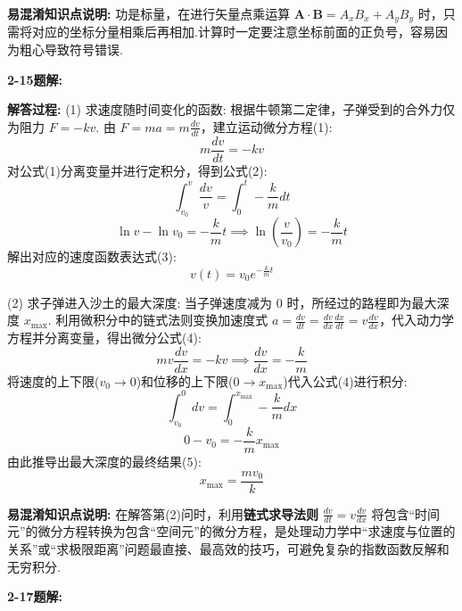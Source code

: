 \textbf{易混淆知识点说明:}
功是标量，在进行矢量点乘运算 $\mathbf{A} \cdot \mathbf{B} = A_x B_x + A_y B_y$ 时，只需将对应的坐标分量相乘后再相加.计算时一定要注意坐标前面的正负号，容易因为粗心导致符号错误.

\vspace{2em}

\textbf{2-15题解:}


\textbf{解答过程:}
(1) 求速度随时间变化的函数:
根据牛顿第二定律，子弹受到的合外力仅为阻力 $F = -kv$.
由 $F = ma = m\frac{dv}{dt}$，建立运动微分方程(1):
\begin{equation}
	m\frac{dv}{dt} = -kv
\end{equation}
对公式(1)分离变量并进行定积分，得到公式(2):
\begin{equation}
	\int_{v_0}^{v} \frac{dv}{v} = \int_{0}^{t} -\frac{k}{m} dt
\end{equation}
$$\ln v - \ln v_0 = -\frac{k}{m}t \implies \ln\left(\frac{v}{v_0}\right) = -\frac{k}{m}t$$
解出对应的速度函数表达式(3):
\begin{equation}
	v(t) = v_0 e^{-\frac{k}{m}t}
\end{equation}

(2) 求子弹进入沙土的最大深度:
当子弹速度减为 $0$ 时，所经过的路程即为最大深度 $x_{\text{max}}$.
利用微积分中的链式法则变换加速度式 $a = \frac{dv}{dt} = \frac{dv}{dx}\frac{dx}{dt} = v\frac{dv}{dx}$，代入动力学方程并分离变量，得出微分公式(4):
\begin{equation}
	m v \frac{dv}{dx} = -kv \implies \frac{dv}{dx} = -\frac{k}{m}
\end{equation}
将速度的上下限($v_0 \to 0$)和位移的上下限($0 \to x_{\text{max}}$)代入公式(4)进行积分:
$$\int_{v_0}^{0} dv = \int_{0}^{x_{\text{max}}} -\frac{k}{m} dx$$
$$0 - v_0 = -\frac{k}{m} x_{\text{max}}$$
由此推导出最大深度的最终结果(5):
\begin{equation}
	x_{\text{max}} = \frac{mv_0}{k}
\end{equation}

\textbf{易混淆知识点说明:}
在解答第(2)问时，利用\textbf{链式求导法则} $\frac{dv}{dt} = v\frac{dv}{dx}$ 将包含“时间元”的微分方程转换为包含“空间元”的微分方程，是处理动力学中“求速度与位置的关系”或“求极限距离”问题最直接、最高效的技巧，可避免复杂的指数函数反解和无穷积分.

\vspace{2em}

\textbf{2-17题解:}


